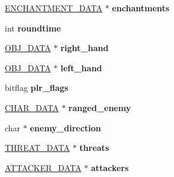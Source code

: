 \begin{DoxyCompactItemize}
\item 
\hypertarget{structchar__data_a5d9e51de423e2eced49e6a2a0ba930d2}{\hyperlink{structenchantment__data}{E\-N\-C\-H\-A\-N\-T\-M\-E\-N\-T\-\_\-\-D\-A\-T\-A} $\ast$ {\bfseries enchantments}}\label{structchar__data_a5d9e51de423e2eced49e6a2a0ba930d2}

\item 
\hypertarget{structchar__data_ae02e0ff3bfa907da3a83aa89ff69f8d4}{int {\bfseries roundtime}}\label{structchar__data_ae02e0ff3bfa907da3a83aa89ff69f8d4}

\item 
\hypertarget{structchar__data_a80e146027ae72e35a25309308fe75ff6}{\hyperlink{structobj__data}{O\-B\-J\-\_\-\-D\-A\-T\-A} $\ast$ {\bfseries right\-\_\-hand}}\label{structchar__data_a80e146027ae72e35a25309308fe75ff6}

\item 
\hypertarget{structchar__data_ab469b8fdf57e356ef0e3b9b803639958}{\hyperlink{structobj__data}{O\-B\-J\-\_\-\-D\-A\-T\-A} $\ast$ {\bfseries left\-\_\-hand}}\label{structchar__data_ab469b8fdf57e356ef0e3b9b803639958}

\item 
\hypertarget{structchar__data_a5f3a85a5267b96c382930de7eb15d8a5}{bitflag {\bfseries plr\-\_\-flags}}\label{structchar__data_a5f3a85a5267b96c382930de7eb15d8a5}

\item 
\hypertarget{structchar__data_a56d8c701dc162c5a5d9f9588601cb79f}{\hyperlink{structchar__data}{C\-H\-A\-R\-\_\-\-D\-A\-T\-A} $\ast$ {\bfseries ranged\-\_\-enemy}}\label{structchar__data_a56d8c701dc162c5a5d9f9588601cb79f}

\item 
\hypertarget{structchar__data_a856ba0e787b1b2f4e31133729ced7f0b}{char $\ast$ {\bfseries enemy\-\_\-direction}}\label{structchar__data_a856ba0e787b1b2f4e31133729ced7f0b}

\item 
\hypertarget{structchar__data_a0841def53b45eb0635075b57aa37b95d}{\hyperlink{structthreat__data}{T\-H\-R\-E\-A\-T\-\_\-\-D\-A\-T\-A} $\ast$ {\bfseries threats}}\label{structchar__data_a0841def53b45eb0635075b57aa37b95d}

\item 
\hypertarget{structchar__data_a7d237737d6923afacc942d4b753a7902}{\hyperlink{structattacker__data}{A\-T\-T\-A\-C\-K\-E\-R\-\_\-\-D\-A\-T\-A} $\ast$ {\bfseries attackers}}\label{structchar__data_a7d237737d6923afacc942d4b753a7902}


\end{DoxyCompactItemize}
